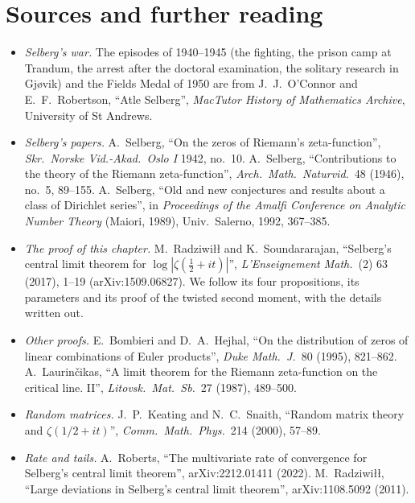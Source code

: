 \section*{Sources and further reading}

\begin{itemize}
\item \emph{Selberg's war.} The episodes of 1940--1945 (the fighting, the prison camp at Trandum, the arrest after the doctoral examination, the solitary research in Gj\o{}vik) and the Fields Medal of 1950 are from J.~J.~O'Connor and E.~F.~Robertson, ``Atle Selberg'', \emph{MacTutor History of Mathematics Archive}, University of St Andrews.
\item \emph{Selberg's papers.} A.~Selberg, ``On the zeros of Riemann's zeta-function'', \emph{Skr.\ Norske Vid.-Akad.\ Oslo I} 1942, no.~10. A.~Selberg, ``Contributions to the theory of the Riemann zeta-function'', \emph{Arch.\ Math.\ Naturvid.}\ 48 (1946), no.~5, 89--155. A.~Selberg, ``Old and new conjectures and results about a class of Dirichlet series'', in \emph{Proceedings of the Amalfi Conference on Analytic Number Theory} (Maiori, 1989), Univ.\ Salerno, 1992, 367--385.
\item \emph{The proof of this chapter.} M.~Radziwi\l\l{} and K.~Soundararajan, ``Selberg's central limit theorem for $\log|\zeta(\frac12+it)|$'', \emph{L'Enseignement Math.}\ (2) 63 (2017), 1--19 (arXiv:1509.06827). We follow its four propositions, its parameters and its proof of the twisted second moment, with the details written out.
\item \emph{Other proofs.} E.~Bombieri and D.~A.~Hejhal, ``On the distribution of zeros of linear combinations of Euler products'', \emph{Duke Math.\ J.}\ 80 (1995), 821--862. A.~Laurinčikas, ``A limit theorem for the Riemann zeta-function on the critical line. II'', \emph{Litovsk.\ Mat.\ Sb.}\ 27 (1987), 489--500.
\item \emph{Random matrices.} J.~P.~Keating and N.~C.~Snaith, ``Random matrix theory and $\zeta(1/2+it)$'', \emph{Comm.\ Math.\ Phys.}\ 214 (2000), 57--89.
\item \emph{Rate and tails.} A.~Roberts, ``The multivariate rate of convergence for Selberg's central limit theorem'', arXiv:2212.01411 (2022). M.~Radziwi\l\l, ``Large deviations in Selberg's central limit theorem'', arXiv:1108.5092 (2011).
\end{itemize}
